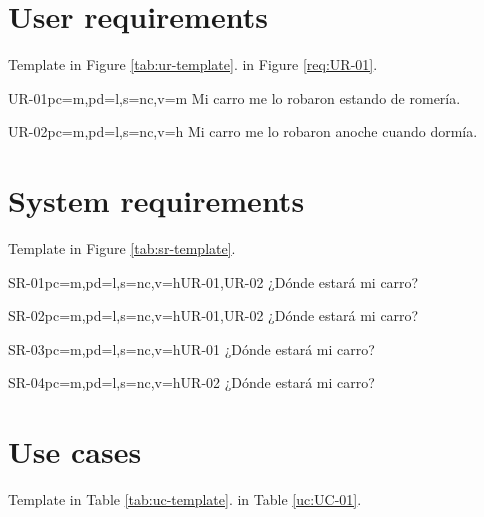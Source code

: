 \documentclass[a4paper,10pt]{article}
\begin{document}
  \section{User requirements}

  Template in Figure \ref{tab:ur-template}.
   in Figure \ref{req:UR-01}.



  \begin{userReq}{UR-01}{pc=m,pd=l,s=nc,v=m}
    Mi carro me lo robaron estando de romería.
  \end{userReq}
  
  \begin{userReq}{UR-02}{pc=m,pd=l,s=nc,v=h}
    Mi carro me lo robaron anoche cuando dormía.
  \end{userReq}

  \FloatBarrier


  \section{System requirements}
  Template in Figure \ref{tab:sr-template}.


  \begin{softwareReq}{SR-01}{pc=m,pd=l,s=nc,v=h}{UR-01,UR-02}
    ¿Dónde estará mi carro?
  \end{softwareReq}
  
  \begin{softwareReq}{SR-02}{pc=m,pd=l,s=nc,v=h}{UR-01,UR-02}
    ¿Dónde estará mi carro?
  \end{softwareReq}

  \begin{softwareReq}{SR-03}{pc=m,pd=l,s=nc,v=h}{UR-01}
    ¿Dónde estará mi carro?
  \end{softwareReq}

  \begin{softwareReq}{SR-04}{pc=m,pd=l,s=nc,v=h}{UR-02}
    ¿Dónde estará mi carro?
  \end{softwareReq}

  \FloatBarrier


  \section{Use cases}
  Template in Table \ref{tab:uc-template}.
   in Table \ref{uc:UC-01}.
\end{document}
